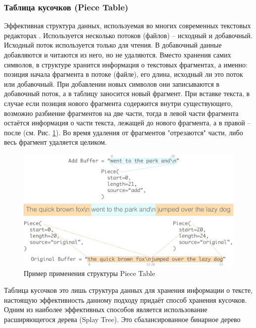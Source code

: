 \documentclass{fefu}
\begin{document}
			\subsubsection{Таблица кусочков (Piece Table)}
				\par Эффективная структура данных, используемая во многих современных 
				текстовых редакторах \cite{PieceTableArticle}. Используется несколько потоков
				(файлов) -- исходный и добавочный. Исходный поток используется только для 
				чтения. В добавочный данные добавляются и читаются из него, но не удаляются.
				Вместо хранения самих символов, в структуре хранится информация о текстовых 
				фрагментах, а именно: позиция начала фрагмента в потоке (файле), его длина, 
				исходный ли это поток или добавочный. При добавлении новых символов они
				записываются в добавочный поток, а в таблицу заносится новый фрагмент. При
				вставке текста, в случае если позиция нового фрагмента содержится внутри
				существующего, возможно разбиение фрагментов на две части, тогда в левой части
				фрагмента остаётся информация о части текста, лежащей до нового фрагмента, а в 
				правой -- после (см. Рис. \ref{img:PieceTableExample}). Во время удаления от 
				фрагментов "отрезаются" части, либо весь фрагмент удаляется целиком.
				\begin{figure}[h]
					\centering
					\includegraphics[width=1\linewidth]{images/PieceTableExample.png}
					\caption{Пример применения структуры Piece Table}
					\label{img:PieceTableExample}
				\end{figure}
				\par Таблица кусочков это лишь структура данных для хранения информации о
				тексте, настоящую эффективность данному подходу придаёт способ хранения
				кусочков. Одним из наиболее эффективных способов является использование 
				расширяющегося дерева (Splay Tree). Это сбалансированное бинарное дерево 
\end{document}
